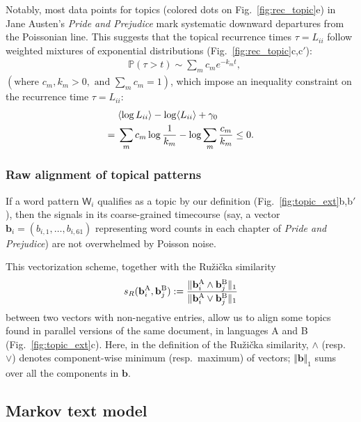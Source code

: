 \documentclass[10pt,journal,compsoc]{IEEEtran}
\begin{document}
Notably,  most data points for  topics  (colored dots on Fig.~\ref{fig:rec_topic}e) in Jane Austen's \textit{Pride and Prejudice} mark systematic downward departures from the Poissonian line. This suggests that the topical recurrence times  $ \tau=L_{ii}$   follow weighted mixtures of exponential distributions (Fig.~\ref{fig:rec_topic}c,c$'$):\begin{align}&\mathbb P(\tau>t)\sim\sum_mc_me^{-k_mt},\label{eq:multi_exp}
\end{align}$\left(\text{where }c_m,k_m>0,\text{ and }\sum_mc_m=1\right)$, which impose an inequality constraint on the   recurrence time $ \tau=L_{ii}$:\begin{align}&\langle\log L_{ii}\rangle-\log\langle L_{ii}\rangle+\gamma_0\notag\\={}& \sum_m c_m\log\frac{1}{k_m}-\log\sum_m \frac{c_m}{k_m}\leq 0.\label{ineq:log_Lf}
\end{align}


\subsubsection{Raw alignment of topical patterns}If a word pattern $ \mathsf W_i$ qualifies as a topic  by our definition (Fig.~\ref{fig:topic_ext}b,b$'$), then the signals in its coarse-grained timecourse (say, a vector  $\mathbf b_i=(b_{i,1},\dots,b_{i,61}) $ representing   word counts in each chapter of \textit{Pride and Prejudice}) are not overwhelmed by Poisson  noise.


This vectorization scheme, together with the Ru\v zi\v cka similarity \cite{Ruzicka1958} \begin{align} s_R(\mathbf b_i^{\mathrm A},\mathbf b_j^{\mathrm B}):=\frac{\Vert \smash[b]{\mathbf b_i^{\mathrm A}\wedge\mathbf b_j^{\mathrm B}}\Vert_1}{\Vert \smash[b]{\mathbf b_i^{\mathrm A}\vee\mathbf b_j^{\mathrm B}}\Vert_{1}}\end{align} between two vectors with non-negative entries, allow us to  align some topics found in parallel versions of the same document, in languages A and B
 (Fig.~\ref{fig:topic_ext}c). Here, in the definition of  the Ru\v zi\v cka similarity,   $ \wedge$ (resp.~$ \vee$) denotes component-wise minimum (resp.~maximum) of vectors; $ \Vert\mathbf b\Vert_1$ sums over all the components in $ \mathbf b$.

\subsection{Markov text model}
\end{document}
